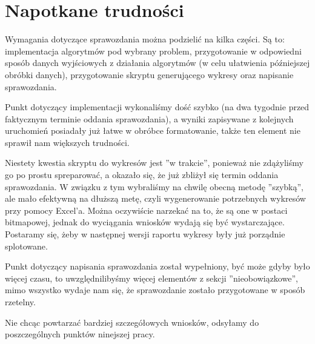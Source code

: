 \section{Napotkane trudności}
Wymagania dotyczące sprawozdania można podzielić na kilka części. Są to: implementacja algorytmów pod wybrany problem, przygotowanie w odpowiedni sposób danych wyjściowych z działania algorytmów (w celu ułatwienia późniejszej obróbki danych), przygotowanie skryptu generującego wykresy oraz napisanie sprawozdania.

Punkt dotyczący implementacji wykonaliśmy dość szybko (na dwa tygodnie przed faktycznym terminie oddania sprawozdania), a wyniki zapisywane z kolejnych uruchomień posiadały już łatwe w obróbce formatowanie, także ten element nie sprawił nam większych trudności.

Niestety kwestia skryptu do wykresów jest ''w trakcie'', ponieważ nie zdążyliśmy go po prostu spreparować, a okazało się, że już zbliżył się termin oddania sprawozdania. W związku z tym wybraliśmy na chwilę obecną metodę ''szybką'', ale mało efektywną na dłuższą metę, czyli wygenerowanie potrzebnych wykresów przy pomocy Excel'a. Można oczywiście narzekać na to, że są one w postaci bitmapowej, jednak do wyciągania wniosków wydają się być wystarczające. Postaramy się, żeby w następnej wersji raportu wykresy były już porządnie splotowane.

Punkt dotyczący napisania sprawozdania został wypełniony, być może gdyby było więcej czasu, to uwzględnilibyśmy więcej elementów z sekcji ''nieobowiązkowe'', mimo wszystko wydaje nam się, że sprawozdanie zostało przygotowane w sposób rzetelny.

Nie chcąc powtarzać bardziej szczegółowych wniosków, odsyłamy do poszczególnych punktów ninejszej pracy.